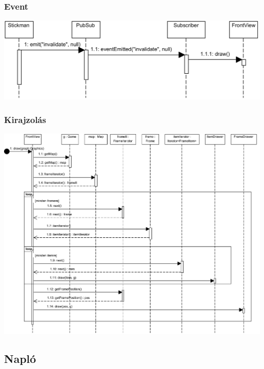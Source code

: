 		\subsubsection{Event}
		    \begin{center}
			    \includegraphics[scale=0.88]{resources/event.png}
		    \end{center}

		\subsubsection{Kirajzolás}
		    \begin{center}
			    \includegraphics[scale=0.95, angle=-90]{resources/drawing.png}
		    \end{center}
	
		\subsection{Napló}
	


